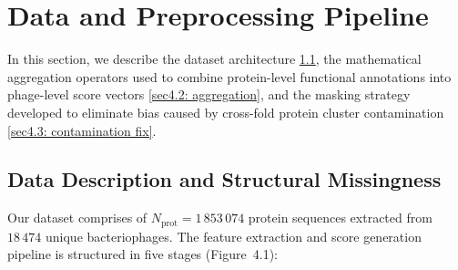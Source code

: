 


\chapter{Data and Preprocessing Pipeline}
\label{sec4: data}
\noindent In this section, we describe the dataset architecture \ref{sec4.1: data description}, the mathematical aggregation 
operators used to combine protein-level functional annotations into phage-level score vectors \ref{sec4.2: aggregation}, and the 
masking strategy developed to eliminate bias caused by cross-fold protein cluster contamination \ref{sec4.3: contamination fix}.

\section{Data Description and Structural Missingness}
\label{sec4.1: data description}
Our dataset comprises of $N_{\text{prot}} = 1\,853\,074$ protein sequences extracted from $18\,474$ unique bacteriophages. 
The feature extraction and score generation pipeline is structured in five stages (Figure~4.1):


